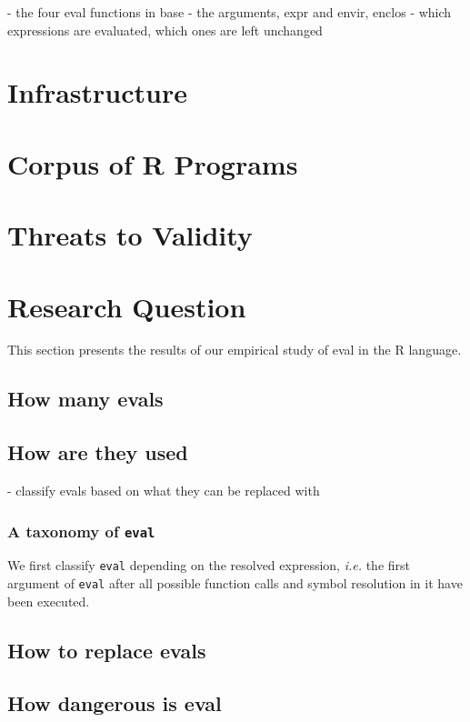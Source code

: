 \documentclass[conference]{IEEEtran}
\begin{document}
- the four eval functions in base
- the arguments, expr and envir, enclos
- which expressions are evaluated, which ones are left unchanged

\section{Infrastructure}


\section{Corpus of R Programs}


\section{Threats to Validity}


\section{Research Question}
This section presents the results of our empirical study of eval in the R language.
\subsection{How many evals}


\subsection{How are they used}

- classify evals based on what they can be replaced with

\subsubsection{A taxonomy of \texttt{eval}}

We first classify \texttt{eval} depending on the resolved expression, \emph{i.e.} the first argument of \texttt{eval} after all possible function calls and symbol resolution in it have been executed.



\subsection{How to replace evals}


\subsection{How dangerous is eval}
\end{document}
